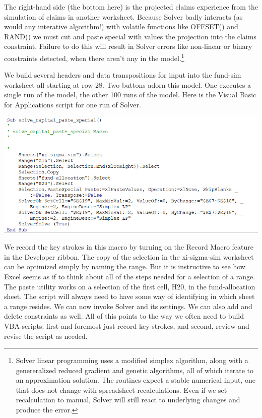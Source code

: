 \documentclass[
]{book}
\begin{document}
The right-hand side (the bottom here) is the projected claims experience from the simulation of claims in another worksheet. Because Solver badly interacts (as would any interative algorithm!) with volatile functions like OFFSET() and RAND() we must cut and paste special with values the projection into the claims constraint. Failure to do this will result in Solver errors like non-linear or binary constraints detected, when there aren't any in the model.\footnote{Solver linear programming uses a modified simplex algorithm, along with a genereralized reduced gradient and genetic algorithms, all of which iterate to an approximation solution. The routines expect a stable numerical input, one that does not change with spreadsheet recalculations. Even if we set recalculation to manual, Solver will still react to underlying changes and produce the error.}

We build several headers and data transpositions for input into the fund-sim worksheet all starting at row 28. Two buttons adorn this model. One executes a single run of the model, the other 100 runs of the model. Here is the Visual Basic for Applications script for one run of Solver.

\includegraphics{images/06/claims-one-run-vba.jpg}

We record the key strokes in this macro by turning on the Record Macro feature in the Developer ribbon. The copy of the selection in the xi-sigma-sim worksheet can be optimized simply by naming the range. But it is instructive to see how Excel seems as if to think about all of the steps needed for a selection of a range. The paste utility works on a selection of the first cell, H20, in the fund-allocation sheet. The script will always need to have some way of identifying in which sheet a range resides. We can now invoke Solver and its settings. We can also add and delete constraints as well. All of this points to the way we often need to build VBA scripts: first and foremost just record key strokes, and second, review and revise the script as needed.
\end{document}
